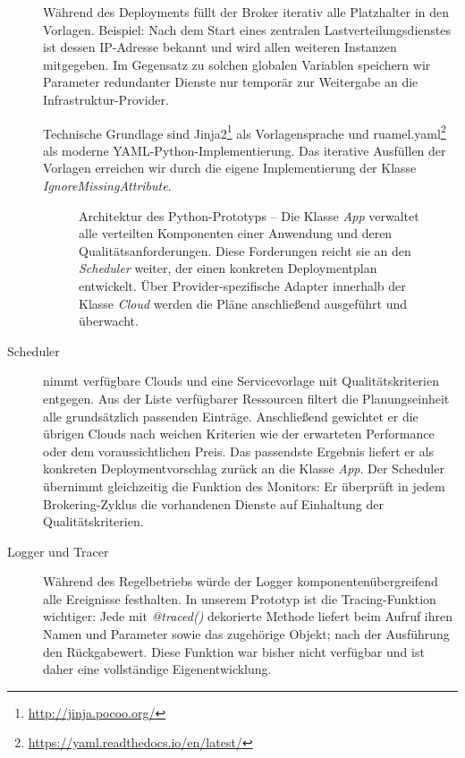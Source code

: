 \begin{description}
	Während des Deployments füllt der Broker iterativ alle Platzhalter in den Vorlagen. Beispiel: Nach dem Start eines zentralen Lastverteilungsdienstes ist dessen IP-Adresse bekannt und wird allen weiteren Instanzen mitgegeben. Im Gegensatz zu solchen globalen Variablen speichern wir Parameter redundanter Dienste nur temporär zur Weitergabe an die Infrastruktur-Provider.
	
	Technische Grundlage sind Jinja2\footnote{\url{http://jinja.pocoo.org/}} als Vorlagensprache und ruamel.yaml\footnote{\url{https://yaml.readthedocs.io/en/latest/}} als moderne YAML-Python-Implementierung. Das iterative Ausfüllen der Vorlagen erreichen wir durch die eigene Implementierung der Klasse \emph{IgnoreMissingAttribute}.
	
	\begin{figure}[ht]
		\centering
		\def\svgwidth{0.95\textwidth}
		{\scriptsize \textsf{
				}}
		\caption{Architektur des Python-Prototyps -- Die Klasse \emph{App} verwaltet alle verteilten Komponenten einer Anwendung und deren Qualitätsanforderungen. Diese Forderungen reicht sie an den \emph{Scheduler} weiter, der einen konkreten Deploymentplan entwickelt. Über Provider-spezifische Adapter innerhalb der Klasse \emph{Cloud} werden die Pläne anschließend ausgeführt und überwacht.}
		\label{fig:broker-architecture}
	\end{figure}
			
	\item[Scheduler] nimmt verfügbare Clouds und eine Servicevorlage mit Qualitätskriterien entgegen. Aus der Liste verfügbarer Ressourcen filtert die Planungseinheit alle grundsätzlich passenden Einträge. Anschließend gewichtet er die übrigen Clouds nach weichen Kriterien wie der erwarteten Performance oder dem voraussichtlichen Preis. Das passendste Ergebnis liefert er als konkreten Deploymentvorschlag zurück an die Klasse \emph{App}. Der Scheduler übernimmt gleichzeitig die Funktion des Monitors: Er überprüft in jedem Brokering-Zyklus die vorhandenen Dienste auf Einhaltung der Qualitätskriterien.

	\item[Logger und Tracer] Während des Regelbetriebs würde der Logger komponentenübergreifend alle Ereignisse festhalten. In unserem Prototyp ist die Tracing-Funktion wichtiger: Jede mit \emph{@traced()} dekorierte Methode liefert beim Aufruf ihren Namen und Parameter sowie das zugehörige Objekt; nach der Ausführung den Rückgabewert. Diese Funktion war bisher nicht verfügbar und ist daher eine vollständige Eigenentwicklung.
	

\end{description}

